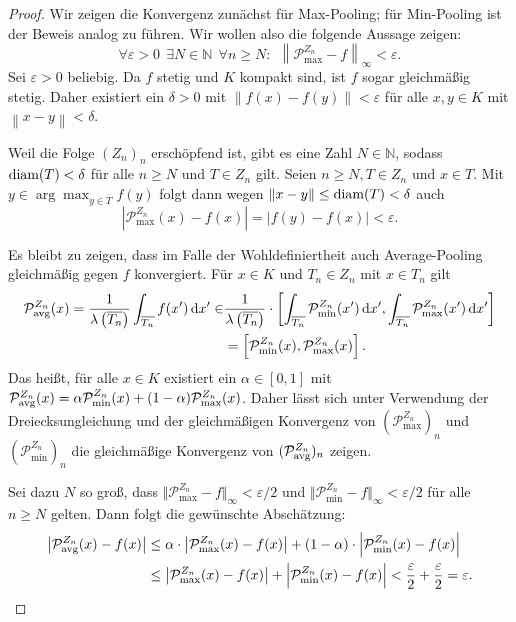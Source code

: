 \documentclass[paper=a4, 	%
		fontsize=11pt,
		abstract=true, 	%
		headsepline, 	%
		notitlepage	%
		]{scrartcl}
\theoremstyle{definition}
\newcommand{\N}{\mathbb{N}}
\newcommand{\diff}{\,\textrm{d}}
\newcommand{\norm}[1]{\left\lVert#1\right\rVert}
\newcommand{\abs}[1]{\left\lvert#1\right\rvert}
\newcommand{\avg}{\textnormal{avg}}
\newcommand{\diam}{\textnormal{diam}}
\begin{document}
\begin{proof}
    Wir zeigen die Konvergenz zunächst für Max-Pooling; für Min-Pooling ist der Beweis analog zu führen.
    Wir wollen also die folgende Aussage zeigen:
    \[\forall \varepsilon > 0 ~~ \exists N\in\N ~~ \forall n\geq N:~~\norm{\mathcal{P}^{Z_n}_{\max} - f}_{\infty} < \varepsilon.\]
    Sei $\varepsilon > 0$ beliebig. 
    Da $f$ stetig und $K$ kompakt sind, ist $f$ sogar gleichmäßig stetig.
    Daher existiert ein $\delta>0$ mit $\norm{f(x)- f(y)} < \varepsilon$ für alle $x,y\in K$ mit $\norm{x-y}< \delta$.

    Weil die Folge $(Z_n)_n$ erschöpfend ist, gibt es eine Zahl $N\in\N$, sodass $\diam(T) < \delta$ für alle $n\geq N$ und $T\in Z_n$ gilt.
    Seien $n\geq N, T\in Z_n$ und $x\in T$. Mit $y\in\arg\max_{y\in\overline{T}} f(y)$ folgt dann wegen $\norm{x-y} \leq \diam(T) < \delta$ auch
    \[
        \abs{\mathcal{P}_{\max}^{Z_n}(x) - f(x)} = \abs{f(y) - f(x)}  < \varepsilon.
    \]

    Es bleibt zu zeigen, dass im Falle der Wohldefiniertheit auch Average-Pooling gleich\-mäßig gegen $f$ konvergiert.
    Für $x\in K$ und $T_n\in Z_n$ mit $x\in T_n$ gilt
    \begin{align*}
        \mathcal{P}^{Z_n}_{\avg}(x) = \frac{1}{\lambda\left(\overline{T_n}\right)} \int_{\overline{T_n}} f(x') \diff x'
        \in &\frac{1}{\lambda\left(\overline{T_n}\right)}\cdot \left[ \int_{\overline{T_n}} \mathcal{P}^{Z_n}_{\min}(x') \diff x', \int_{\overline{T_n}} \mathcal{P}^{Z_n}_{\max}(x') \diff x'  \right] \\
        &= \left[ \mathcal{P}^{Z_n}_{\min}(x), \mathcal{P}^{Z_n}_{\max}(x)  \right].
    \end{align*}
    Das heißt, für alle $x\in K$ existiert ein $\alpha\in[0,1]$ mit $\mathcal{P}^{Z_n}_{\avg}(x) = \alpha \mathcal{P}^{Z_n}_{\min}(x) + (1-\alpha)  \mathcal{P}^{Z_n}_{\max}(x)$.
    Daher lässt sich unter Verwendung der Dreiecksungleichung und der gleichmäßigen Konvergenz von $(\mathcal{P}^{Z_n}_{\max})_n$ und $(\mathcal{P}^{Z_n}_{\min})_n$ die gleichmäßige Konvergenz von  $(\mathcal{P}^{Z_n}_{\avg})_n$ zeigen.

    Sei dazu $N$ so groß, dass $\Vert\mathcal{P}^{Z_n}_{\max} - f\Vert_{\infty} < \varepsilon / 2$ und $\Vert\mathcal{P}^{Z_n}_{\min} - f\Vert_{\infty} < \varepsilon / 2$ für alle $n \geq N$ gelten.
    Dann folgt die gewünschte Abschätzung:
    \begin{align*}
        \abs{\mathcal{P}_{\avg}^{Z_n}(x) - f(x)}
        &\leq \alpha \cdot \abs{\mathcal{P}_{\max}^{Z_n}(x) - f(x)} + (1-\alpha) \cdot \abs{\mathcal{P}_{\min}^{Z_n}(x) - f(x)} \\
        &\leq\abs{\mathcal{P}_{\max}^{Z_n}(x) - f(x)} + \abs{\mathcal{P}_{\min}^{Z_n}(x) - f(x)} 
        < \frac{\varepsilon}{2} + \frac{\varepsilon}{2} = \varepsilon. \qedhere
    \end{align*}
\end{proof}
\end{document}
